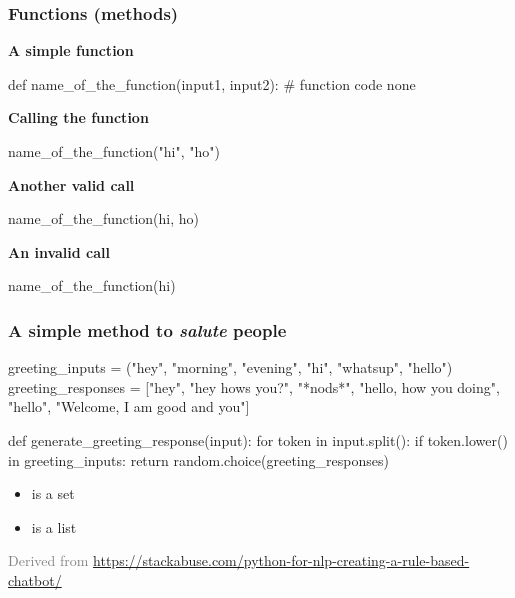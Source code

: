 \documentclass[handout]{beamer}
\newcommand{\light}[1]{\textcolor{gray}{#1}}
\begin{document}
\begin{frame}[fragile]
\frametitle{Functions (methods)}

\textbf{A simple function}
\begin{python}
  def name_of_the_function(input1, input2):
      # function code
      none
\end{python}
\pause

\textbf{Calling the function}
\begin{python}
name_of_the_function("hi", "ho")
\end{python}
\pause

\textbf{Another valid call}
\begin{python}
name_of_the_function(hi, ho)
\end{python}
\pause

\textbf{An invalid call}
\begin{python}
name_of_the_function(hi)
\end{python}

\end{frame}


\begin{frame}[fragile]
\frametitle{A simple method to \textit{salute} people}
\vspace{5mm}

\begin{python}
greeting_inputs = ("hey", "morning", "evening", "hi",
                "whatsup", "hello")
greeting_responses = ["hey", "hey hows you?", "*nods*",
                "hello, how you doing", "hello",
                "Welcome, I am good and you"]

def generate_greeting_response(input):
    for token in input.split():
        if token.lower() in greeting_inputs:
            return random.choice(greeting_responses)
\end{python}
\pause

\begin{itemize}
 \item {} is a \alert{set}
 \item {} is a \alert{list}
\end{itemize}

\onslide
\footnotesize
\light{Derived from
\url{https://stackabuse.com/python-for-nlp-creating-a-rule-based-chatbot/}}
\end{frame}
\end{document}
